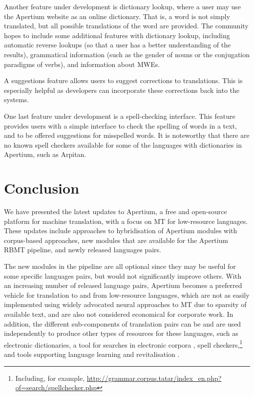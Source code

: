 \documentclass[free]{flammie}
\begin{document}
Another feature under development is dictionary lookup, where a user may use the
Apertium website as an online dictionary.  That is, a word is not simply
translated, but all possible translations of the word are provided.  The
community hopes to include some additional features with dictionary lookup,
including automatic reverse lookups (so that a user has a better understanding
of the results), grammatical information (such as the gender of nouns or the
conjugation paradigms of verbs), and information about MWEs.

A suggestions feature allows users to suggest corrections to translations. This
is especially helpful as developers can incorporate these corrections back into
the systems.

One last feature under development is a spell-checking interface.  This feature
provides users with a simple interface to check the spelling of words in a text,
and to be offered suggestions for misspelled words. It is noteworthy that there
are no known spell checkers available for some of the languages with
dictionaries in Apertium, such as Arpitan.

\section{Conclusion}\label{sec:Conclusion}
We have presented the latest updates to Apertium, a free and open-source
platform for machine translation, with a focus on MT for low-resource languages.
These updates include approaches to hybridisation of Apertium modules with
corpus-based approaches, new modules that are available for the Apertium RBMT
pipeline, and newly released languages pairs.

The new modules in the pipeline are all optional since they may be useful for
some specific languages pairs, but would not significantly improve others.  With
an increasing number of released language pairs, Apertium becomes a preferred
vehicle for translation to and from low-resource languages, which are not as
easily implemented using widely advocated neural approaches to MT due to
sparsity of available text, and are also not considered economical for corporate
work.  In addition, the different sub-components of translation pairs can be and
are used independently to produce other types of resources for these languages,
such as electronic dictionaries, a tool for searches in electronic corpora
\cite[e.g.,]{Saykhunov2019}, spell
checkers,\footnote{Including, for example,
\url{http://grammar.corpus.tatar/index_en.php?of=search/spellchecker.php}} and
tools supporting language learning and revitalisation
\cite[e.g.,]{katinskaia2018revita,ivanova2019tools}.
\end{document}
